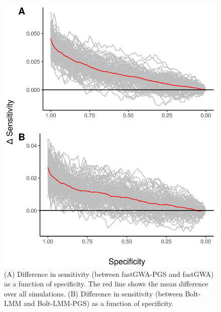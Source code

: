 \documentclass[fleqn,10pt]{wlscirep}
\begin{document}
\begin{figure}
\centering
\includegraphics[width=120mm]{images/Fig2}
\caption{ (A) Difference in sensitivity (between fastGWA-PGS and fastGWA) as a function of specificity. The red line shows the mean difference over all simulations. (B) Difference in sensitivity (between Bolt-LMM and Bolt-LMM-PGS) as a function of specificity.}
\label{fig:deltaROC curves}
\end{figure}
\par
\end{document}
